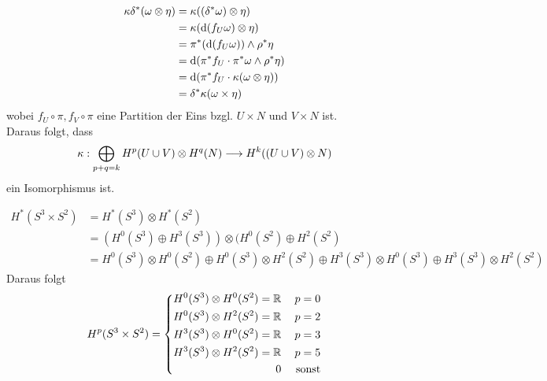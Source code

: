 \begin{Beweis}{}
\begin{align*}
\kappa \delta^*(\omega \otimes \eta) 
&= \kappa((\delta^*\omega) \otimes \eta)\\
&= \kappa(\text{d} (f_U\omega) \otimes \eta )\\
&= \pi^*(\text{d} (f_U\omega)) \wedge \rho^*\eta\\
&= \text{d} (\pi^*f_U \cdot \pi^*\omega \wedge \rho^*\eta)\\
&= \text{d} (\pi^*f_U \cdot \kappa(\omega \otimes \eta))\\
&= \delta^*\kappa(\omega \times \eta)
\end{align*}
wobei $f_U\circ \pi, f_V \circ \pi$ eine Partition der Eins bzgl. $U\times N$ und $V\times N$ ist.\\
Daraus folgt, dass
\[ \kappa : \bigoplus\limits_{p+q = k}H^p(U\cup V)\otimes H^q(N) \overset{}{\longrightarrow} H^k((U\cup V) \otimes N) \]
ein Isomorphismus ist.
\end{Beweis}

\Bsp{}
\begin{align*}
H^*(S^3 \times S^2)&=H^*(S^3)\otimes H^*(S^2)\\
&= (H^0(S^3)\oplus H^3(S^3)) \otimes (H^0(S^2) \oplus H^2(S^2)\\
&= H^0(S^3)\otimes H^0(S^2) \oplus H^0(S^3) \otimes H^2(S^2) 
\oplus H^3(S^3) \otimes H^0(S^3) \oplus H^3(S^3)\otimes H^2(S^2)
\end{align*}
Daraus folgt
\begin{align*}
H^p(S^3 \times S^2) =
\left\lbrace
\begin{aligned}
H^0(S^3)\otimes H^0(S^2) = \mathbb{R} && p= 0\\
H^0(S^3)\otimes H^2(S^2) = \mathbb{R} && p= 2\\
H^3(S^3)\otimes H^0(S^2) = \mathbb{R} && p= 3\\
H^3(S^3)\otimes H^2(S^2) = \mathbb{R} && p= 5\\
0 && \text{ sonst}
\end{aligned}
\right.
\end{align*}

